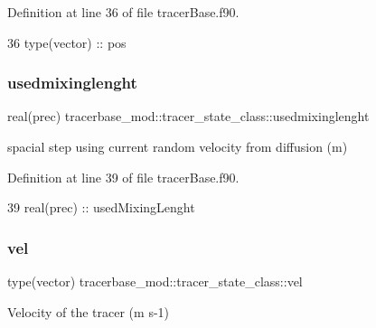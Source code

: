 Definition at line 36 of file tracer\+Base.\+f90.


\begin{DoxyCode}
36         \textcolor{keywordtype}{type}(vector) :: pos
\end{DoxyCode}
\mbox{\label{structtracerbase__mod_1_1tracer__state__class_ad7003d7cad16a57c0e67ca4faf66bb11}} 
\subsubsection{\texorpdfstring{usedmixinglenght}{usedmixinglenght}}
{\footnotesize\ttfamily real(prec) tracerbase\+\_\+mod\+::tracer\+\_\+state\+\_\+class\+::usedmixinglenght\hspace{0.3cm}{\ttfamily [private]}}



spacial step using current random velocity from diffusion (m) 



Definition at line 39 of file tracer\+Base.\+f90.


\begin{DoxyCode}
39         \textcolor{keywordtype}{real(prec)} :: usedMixingLenght
\end{DoxyCode}
\mbox{\label{structtracerbase__mod_1_1tracer__state__class_ae94928588f703077bae9de12c8e9d14b}} 
\subsubsection{\texorpdfstring{vel}{vel}}
{\footnotesize\ttfamily type(vector) tracerbase\+\_\+mod\+::tracer\+\_\+state\+\_\+class\+::vel\hspace{0.3cm}{\ttfamily [private]}}



Velocity of the tracer (m s-\/1) 



